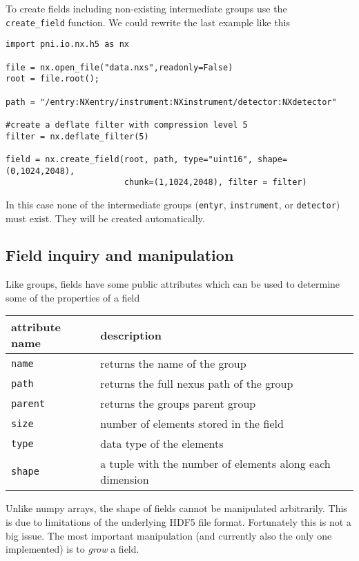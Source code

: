 To create fields including non-existing intermediate groups use the {\tt
create\_field} function. We could rewrite the last example like this
\begin{verbatim}
import pni.io.nx.h5 as nx

file = nx.open_file("data.nxs",readonly=False)
root = file.root();

path = "/entry:NXentry/instrument:NXinstrument/detector:NXdetector"

#create a deflate filter with compression level 5
filter = nx.deflate_filter(5)

field = nx.create_field(root, path, type="uint16", shape=(0,1024,2048),  
                        chunk=(1,1024,2048), filter = filter)
\end{verbatim}
In this case none of the intermediate groups ({\tt entyr}, {\tt instrument},
 or {\tt detector}) must exist. They will be created automatically.


\subsection{Field inquiry and manipulation}

Like groups, fields have some public attributes which can be used to determine
some of the properties of a field 

\begin{center}
\begin{tabular}{l|l}
attribute name & description \\
\hline \hline
{\tt name} & returns the name of the group \\
\hline
{\tt path} & returns the full nexus path of the group\\
\hline
{\tt parent} & returns the groups parent group \\
\hline
{\tt size} & number of elements stored in the field \\
\hline
{\tt type} & data type of the elements \\
\hline
{\tt shape} & a tuple with the number of elements along each dimension \\
\end{tabular}
\end{center}

Unlike numpy arrays, the shape of fields cannot be manipulated arbitrarily. 
This is due to limitations of the underlying HDF5 file format. 
Fortunately this is not a big issue. The most important manipulation (and
currently also the only one implemented) is to \emph{grow} a field. 

